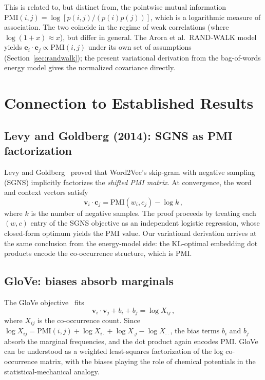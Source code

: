 \documentclass[11pt]{article}
\newcommand{\vw}{\bm{v}}
\newcommand{\ew}{\bm{e}}
\newcommand{\PMI}{\mathrm{PMI}}
\begin{document}
This is related to, but distinct from, the pointwise mutual information $\PMI(i,j) = \log[p(i,j)/(p(i)p(j))]$, which is a logarithmic measure of association. The two coincide in the regime of weak correlations (where $\log(1+x) \approx x$), but differ in general. The Arora et al.\ RAND-WALK model~\cite{arora2016} yields $\ew_i \cdot \ew_j \propto \PMI(i,j)$ under its own set of assumptions (Section~\ref{sec:randwalk}); the present variational derivation from the bag-of-words energy model gives the normalized covariance directly.

\section{Connection to Established Results}\label{sec:connections}

\subsection{Levy and Goldberg (2014): SGNS as PMI factorization}

Levy and Goldberg~\cite{levy2014} proved that Word2Vec's skip-gram with negative sampling (SGNS) implicitly factorizes the \emph{shifted PMI matrix}. At convergence, the word and context vectors satisfy
\begin{equation}\label{eq:levy-goldberg}
    \vw_i \cdot \bm{c}_j = \PMI(w_i, c_j) - \log k\,,
\end{equation}
where $k$ is the number of negative samples. The proof proceeds by treating each $(w, c)$ entry of the SGNS objective as an independent logistic regression, whose closed-form optimum yields the PMI value. Our variational derivation arrives at the same conclusion from the energy-model side: the KL-optimal embedding dot products encode the co-occurrence structure, which is PMI.

\subsection{GloVe: biases absorb marginals}

The GloVe objective~\cite{pennington2014} fits
\begin{equation}\label{eq:glove}
    \vw_i \cdot \vw_j + b_i + b_j = \log X_{ij}\,,
\end{equation}
where $X_{ij}$ is the co-occurrence count. Since $\log X_{ij} = \PMI(i,j) + \log X_{i\cdot} + \log X_{\cdot j} - \log X_{\cdot\cdot}$, the bias terms $b_i$ and $b_j$ absorb the marginal frequencies, and the dot product again encodes PMI. GloVe can be understood as a weighted least-squares factorization of the log co-occurrence matrix, with the biases playing the role of chemical potentials in the statistical-mechanical analogy.
\end{document}
